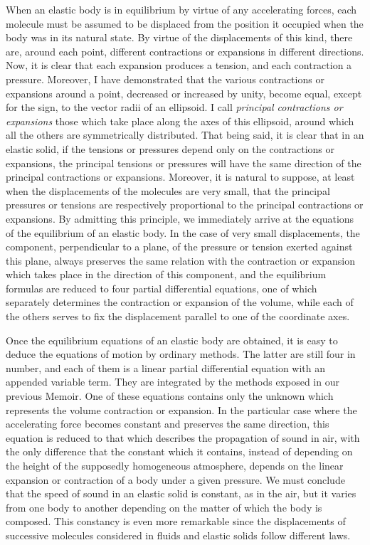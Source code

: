 \documentclass[leqno,openright,smallroyalvopaper,8pt,twoside,showtrims]{memoir}
\begin{document}
When an elastic body is in equilibrium by virtue of any accelerating forces, each molecule must be assumed to be displaced from the position it occupied when the body was in its natural state. By virtue of the displacements of this kind, there are, around each point, different contractions or expansions in different directions. Now, it is clear that each expansion produces a tension, and each contraction a pressure. Moreover, I have demonstrated that the various contractions or expansions around a point, decreased or increased by unity, become equal, except for the sign, to the vector radii of an ellipsoid. I call \emph{principal contractions or expansions} those which take place along the axes of this ellipsoid, around which all the others are symmetrically distributed. That being said, it is clear that in an elastic solid, if the tensions or pressures depend only on the contractions or expansions, the principal tensions or pressures will have the same direction of the principal contractions or expansions. Moreover, it is natural to suppose, at least when the displacements of the molecules are very small, that the principal pressures or tensions are respectively proportional to the principal contractions or expansions. By admitting this principle, we immediately arrive at the equations of the equilibrium of an elastic body. In the case of very small displacements, the component, perpendicular to a plane, of the pressure or tension exerted against this plane, always preserves the same relation with the contraction or expansion which takes place in the direction of this component, and the equilibrium formulas are reduced to four partial differential equations, one of which separately determines the contraction or expansion of the volume, while each of the others serves to fix the displacement parallel to one of the coordinate axes. 

Once the equilibrium equations of an elastic body are obtained, it is easy to deduce the equations of motion by ordinary methods. The latter are still four in number, and each of them is a linear partial differential equation with an appended  variable term. They are integrated by the methods exposed in our previous Memoir. One of these equations contains only the unknown which represents the volume contraction or expansion. In the particular case where the accelerating force becomes constant and preserves the same direction, this equation is reduced to that which describes the propagation of sound in air, with the only difference that the constant which it contains, instead of depending on the height of the supposedly homogeneous atmosphere, depends on the linear expansion or contraction of a body under a given pressure. We must conclude that the speed of sound in an elastic solid is constant, as in the air, but it varies from one body to another depending on the matter of which the body is composed. This constancy is even more remarkable since the displacements of successive molecules considered in fluids and elastic solids follow different laws.
\end{document}
